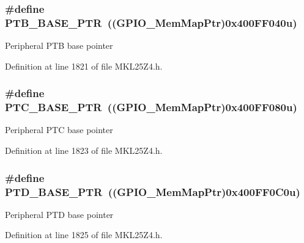 \subsubsection[{\texorpdfstring{P\+T\+B\+\_\+\+B\+A\+S\+E\+\_\+\+P\+TR}{PTB_BASE_PTR}}]{\setlength{\rightskip}{0pt plus 5cm}\#define P\+T\+B\+\_\+\+B\+A\+S\+E\+\_\+\+P\+TR~(({\bf G\+P\+I\+O\+\_\+\+Mem\+Map\+Ptr})0x400\+F\+F040u)}\hypertarget{group___g_p_i_o___peripheral_ga59ab0f28e891ea28f152505ce2021747}{}\label{group___g_p_i_o___peripheral_ga59ab0f28e891ea28f152505ce2021747}
Peripheral P\+TB base pointer 

Definition at line 1821 of file M\+K\+L25\+Z4.\+h.

\subsubsection[{\texorpdfstring{P\+T\+C\+\_\+\+B\+A\+S\+E\+\_\+\+P\+TR}{PTC_BASE_PTR}}]{\setlength{\rightskip}{0pt plus 5cm}\#define P\+T\+C\+\_\+\+B\+A\+S\+E\+\_\+\+P\+TR~(({\bf G\+P\+I\+O\+\_\+\+Mem\+Map\+Ptr})0x400\+F\+F080u)}\hypertarget{group___g_p_i_o___peripheral_gaaa3dc05c2a51a960067e1de6863fd3dd}{}\label{group___g_p_i_o___peripheral_gaaa3dc05c2a51a960067e1de6863fd3dd}
Peripheral P\+TC base pointer 

Definition at line 1823 of file M\+K\+L25\+Z4.\+h.

\subsubsection[{\texorpdfstring{P\+T\+D\+\_\+\+B\+A\+S\+E\+\_\+\+P\+TR}{PTD_BASE_PTR}}]{\setlength{\rightskip}{0pt plus 5cm}\#define P\+T\+D\+\_\+\+B\+A\+S\+E\+\_\+\+P\+TR~(({\bf G\+P\+I\+O\+\_\+\+Mem\+Map\+Ptr})0x400\+F\+F0\+C0u)}\hypertarget{group___g_p_i_o___peripheral_gaa61d2c33375f3becbae1353eee4c1317}{}\label{group___g_p_i_o___peripheral_gaa61d2c33375f3becbae1353eee4c1317}
Peripheral P\+TD base pointer 

Definition at line 1825 of file M\+K\+L25\+Z4.\+h.

